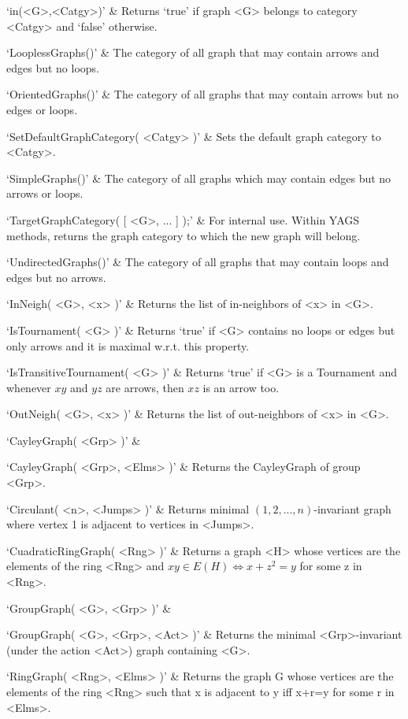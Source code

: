 `in(<G>,<Catgy>)' & 
Returns  `true'  if  graph  <G>  belongs  to  category <Catgy> and `false' otherwise.

`LooplessGraphs()' & 
The category of all graph that may contain arrows and edges but no loops.

`OrientedGraphs()' & 
The category of all graphs that may contain arrows but no edges or loops.

`SetDefaultGraphCategory( <Catgy> )' & 
Sets  the default graph category to <Catgy>.

`SimpleGraphs()' & 
The category of all graphs which may contain edges but no arrows or loops. 

`TargetGraphCategory( [ <G>, ... ] );' & 
For internal use. Within YAGS methods, returns the graph category to which the new graph will belong.

`UndirectedGraphs()' & 
The category of all graphs that may contain loops and edges but no arrows.
\enditems


\beginitems
`InNeigh( <G>, <x> )' & 
Returns the list of in-neighbors of <x> in <G>.

`IsTournament( <G> )' & 
Returns `true' if <G> contains no loops or edges but only arrows and it is maximal w.r.t. this property.

`IsTransitiveTournament( <G> )' & 
Returns `true' if <G> is a Tournament and whenever $xy$ and $yz$ are arrows, then $xz$ is an arrow too.

`OutNeigh( <G>, <x> )' & 
Returns the list of out-neighbors of <x> in <G>.
\enditems


\beginitems
`CayleyGraph( <Grp> )' & 

`CayleyGraph( <Grp>, <Elms> )' & 
Returns the CayleyGraph of group <Grp>.

`Circulant( <n>, <Jumps> )' & 
Returns minimal $(1, 2, ..., n)$-invariant graph where vertex 1 is adjacent to vertices in <Jumps>.

`CuadraticRingGraph( <Rng> )' & 
Returns a graph <H> whose vertices are the elements of the ring <Rng> and $xy\in E(H) \iff x+z^2=y$ for some z in <Rng>.

`GroupGraph( <G>, <Grp> )' & 

`GroupGraph( <G>, <Grp>, <Act> )' & 
Returns the minimal <Grp>-invariant (under the action <Act>) graph containing <G>.

`RingGraph( <Rng>, <Elms> )' & 
Returns  the  graph  G  whose  vertices are the elements of the ring <Rng>
such that x is adjacent to y iff x+r=y for some r in <Elms>.

